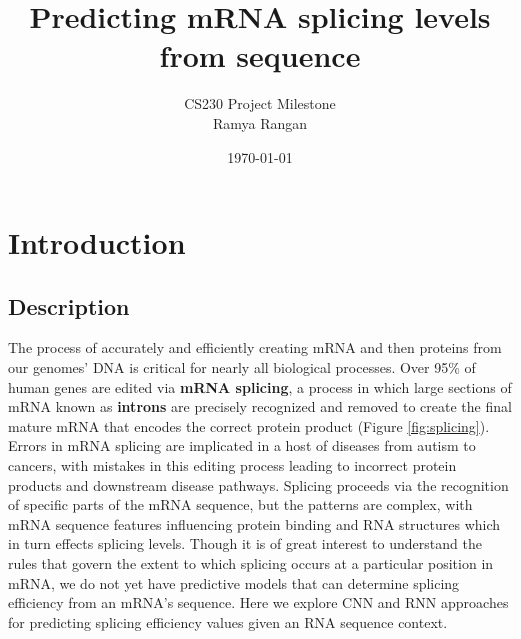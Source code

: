 \documentclass[10.5pt]{article}
\begin{document}
\title{Predicting mRNA splicing levels from sequence}
\author{CS230 Project Milestone \\[1em]
Ramya Rangan}
\date{\today}
\maketitle

\section{Introduction}
\subsection{Description}
The process of accurately and efficiently creating mRNA and then proteins from our genomes' DNA is critical for nearly all biological processes. Over 95\% of human genes are edited via {\bf mRNA splicing}, a process in which large sections of mRNA known as {\bf introns} are precisely recognized and removed to create the final mature mRNA that encodes the correct protein product (Figure \ref{fig:splicing}). Errors in mRNA splicing are implicated in a host of diseases from autism to cancers, with mistakes in this editing process leading to incorrect protein products and downstream disease pathways. Splicing proceeds via the recognition of specific parts of the mRNA sequence, but the patterns are complex, with mRNA sequence features influencing protein binding and RNA structures which in turn effects splicing levels. Though it is of great interest to understand the rules that govern the extent to which splicing occurs at a particular position in mRNA, we do not yet have predictive models that can determine splicing efficiency from an mRNA's sequence. Here we explore CNN and RNN approaches for predicting splicing efficiency values given an RNA sequence context.
\end{document}
